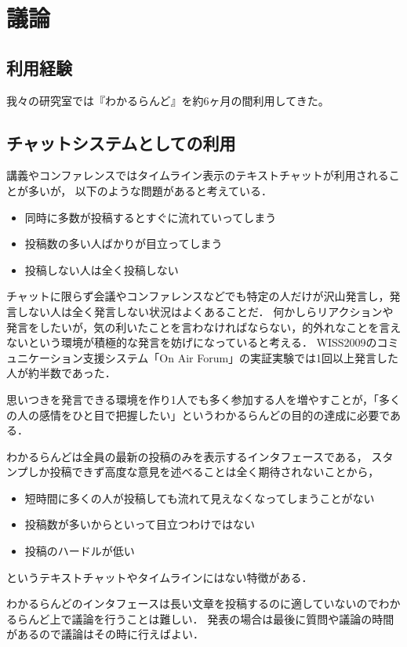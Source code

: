 \section{議論}

\subsection{利用経験}
我々の研究室では『わかるらんど』を約6ヶ月の間利用してきた。

\subsection{チャットシステムとしての利用}

講義やコンファレンスではタイムライン表示のテキストチャットが利用されることが多いが，
以下のような問題があると考えている．

\begin{itemize}
\item 同時に多数が投稿するとすぐに流れていってしまう
\item 投稿数の多い人ばかりが目立ってしまう
\item 投稿しない人は全く投稿しない
\end{itemize}

チャットに限らず会議やコンファレンスなどでも特定の人だけが沢山発言し，発言しない人は全く発言しない状況はよくあることだ．
何かしらリアクションや発言をしたいが，気の利いたことを言わなければならない，的外れなことを言えないという環境が積極的な発言を妨げになっていると考える．
WISS2009のコミュニケーション支援システム「On Air Forum」の実証実験\cite{nishida2011}では1回以上発言した人が約半数であった．


思いつきを発言できる環境を作り1人でも多く参加する人を増やすことが，「多くの人の感情をひと目で把握したい」というわかるらんどの目的の達成に必要である．

わかるらんどは全員の最新の投稿のみを表示するインタフェースである，
スタンプしか投稿できず高度な意見を述べることは全く期待されないことから，

\begin{itemize}
\item 短時間に多くの人が投稿しても流れて見えなくなってしまうことがない
\item 投稿数が多いからといって目立つわけではない
\item 投稿のハードルが低い
\end{itemize}
というテキストチャットやタイムラインにはない特徴がある．

わかるらんどのインタフェースは長い文章を投稿するのに適していないのでわかるらんど上で議論を行うことは難しい．
発表の場合は最後に質問や議論の時間があるので議論はその時に行えばよい．